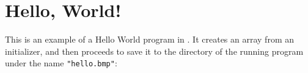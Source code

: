 \section{Hello, World!}

This is an example of a Hello World program in \lepix{}. It creates an array from an initializer, and then proceeds to save it to the directory of the running program under the name \lstinline|"hello.bmp"|:


